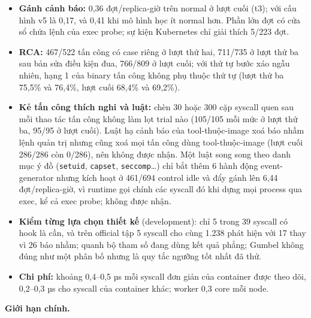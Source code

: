 \begin{itemize}
\tightlist
\item
  \textbf{Gánh cảnh báo:} 0,36 đợt/replica-giờ trên normal ở lượt cuối (t3); với cấu hình v5 là 0,17, và 0,41 khi mô hình học ít normal hơn. Phần lớn đợt có cửa sổ chứa lệnh của exec probe; sự kiện Kubernetes chỉ giải thích 5/223 đợt.
\item
  \textbf{RCA:} 467/522 tấn công có case riêng ở lượt thứ hai, 711/735 ở lượt thứ ba sau bản sửa điều kiện đua, 766/809 ở lượt cuối; với thứ tự bước xáo ngẫu nhiên, hạng 1 của binary tấn công không phụ thuộc thứ tự (lượt thứ ba 75,5\% và 76,4\%, lượt cuối 68,4\% và 69,2\%).
\item
  \textbf{Kẻ tấn công thích nghi và luật:} chèn 30 hoặc 300 cặp syscall quen sau mỗi thao tác tấn công không làm lọt trial nào (105/105 mỗi mức ở lượt thứ ba, 95/95 ở lượt cuối). Luật hạ cảnh báo của tool-thuộc-image xoá báo nhầm lệnh quản trị nhưng cũng xoá mọi tấn công dùng tool-thuộc-image (lượt cuối 286/286 còn 0/286), nên không được nhận. Một luật song song theo danh mục ý đồ (\texttt{setuid}, \texttt{capset}, \texttt{seccomp}\ldots) chỉ bắt thêm 6 hành động event-generator nhưng kích hoạt ở 461/694 control idle và đẩy gánh lên 6,44 đợt/replica-giờ, vì runtime gọi chính các syscall đó khi dựng mọi process qua exec, kể cả exec probe; không được nhận.
\item
  \textbf{Kiểm từng lựa chọn thiết kế} (development): chỉ 5 trong 39 syscall có hook là cần, và trên official tập 5 syscall cho cùng 1.238 phát hiện với 17 thay vì 26 báo nhầm; quanh bộ tham số đang dùng kết quả phẳng; Gumbel không đúng như một phân bố nhưng là quy tắc ngưỡng tốt nhất đã thử.
\item
  \textbf{Chi phí:} khoảng 0,4--0,5 µs mỗi syscall đơn giản của container được theo dõi, 0,2--0,3 µs cho syscall của container khác; worker 0,3 core mỗi node.
\end{itemize}

\textbf{Giới hạn chính.}


